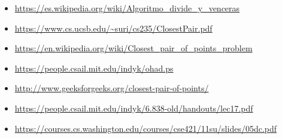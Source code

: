 \documentclass{article}
\begin{document}
	\begin{itemize}
		\item \url{https://es.wikipedia.org/wiki/Algoritmo_divide_y_venceras}	
		
		\item \url{https://www.cs.ucsb.edu/~suri/cs235/ClosestPair.pdf}	
		
		\item \url{https://en.wikipedia.org/wiki/Closest_pair_of_points_problem}
		
		\item \url{https://people.csail.mit.edu/indyk/ohad.ps}
		
		\item \url{http://www.geeksforgeeks.org/closest-pair-of-points/}	
		
		\item \url{https://people.csail.mit.edu/indyk/6.838-old/handouts/lec17.pdf}	
		
		\item \url{https://courses.cs.washington.edu/courses/cse421/11su/slides/05dc.pdf}
		
	\end{itemize}
\end{document}
